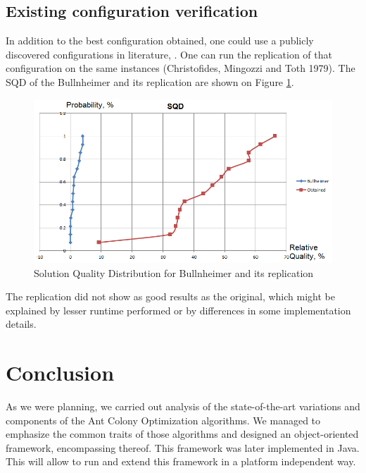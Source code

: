 \documentclass[11pt,a4paper,oneside]{book}
\begin{document}
\section{Existing configuration verification}

In addition to the best configuration obtained, one could use a publicly discovered configurations in literature, \cite{DBLP:journals/anor/BullnheimerHS99}. One can run the replication of that configuration on the same instances (Christofides, Mingozzi and Toth 1979). The SQD of the Bullnheimer and its replication are shown on Figure \ref{fig:sqd-bullheimer-obtained}.

\begin{figure}[h]
  \centering
    \includegraphics[scale=0.8]{sqd-bullnheimer-obtained.PNG}
  \caption{Solution Quality Distribution for Bullnheimer and its replication}
  \label{fig:sqd-bullheimer-obtained}
\end{figure}

The replication did not show as good results as the original, which might be explained by lesser runtime performed or by differences in some implementation details.




\chapter{Conclusion}

As we were planning, we carried out analysis of the state-of-the-art variations and components of the Ant Colony Optimization algorithms. We managed to emphasize the common traits of those algorithms and designed an object-oriented framework, encompassing thereof. This framework was later implemented in Java. This will allow to run and extend this framework in a platform independent way.
\end{document}
